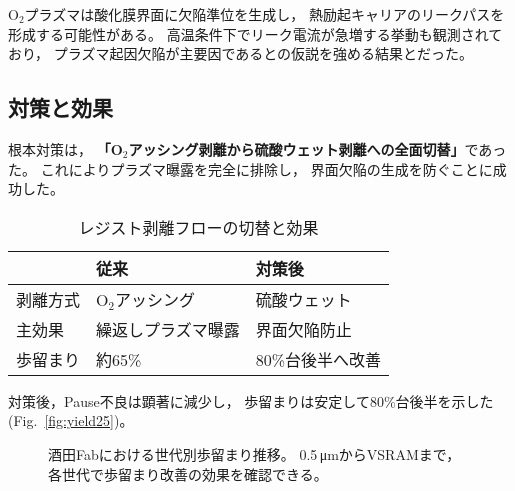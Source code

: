 \documentclass[conference]{IEEEtran}
\let\meter\metre
\begin{document}
O$_2$プラズマは酸化膜界面に欠陥準位を生成し，
熱励起キャリアのリークパスを形成する可能性がある。  
高温条件下でリーク電流が急増する挙動も観測されており，
プラズマ起因欠陥が主要因であるとの仮説を強める結果とだった。

\subsection{対策と効果}
根本対策は，
\textbf{「O$_2$アッシング剥離から硫酸ウェット剥離への全面切替」}であった。  
これによりプラズマ曝露を完全に排除し，
界面欠陥の生成を防ぐことに成功した。  

\begin{table}[h]
  \centering
  \caption{レジスト剥離フローの切替と効果}
  \label{tab:resist}
  \begin{tabular}{lll}
    \toprule
    & 従来 & 対策後 \\
    \midrule
    剥離方式 & O$_2$アッシング & 硫酸ウェット \\
    主効果 & 繰返しプラズマ曝露 & 界面欠陥防止 \\
    歩留まり & 約65\% & 80\%台後半へ改善 \\
    \bottomrule
  \end{tabular}
\end{table}

対策後，Pause不良は顕著に減少し，
歩留まりは安定して80\%台後半を示した
(Fig.~\ref{fig:yield25})。  

\begin{figure}[t]
\centering
{}

\caption{酒田Fabにおける世代別歩留まり推移。
0.5\,\si{\micro\meter}からVSRAMまで，各世代で歩留まり改善の効果を確認できる。}
\label{fig:yield_all}
\end{figure}
\end{document}
